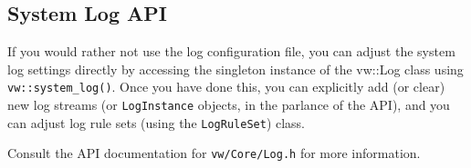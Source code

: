 \subsection{System Log API}
If you would rather not use the log configuration file, you can adjust
the system log settings directly by accessing the singleton instance of
the vw::Log class using \verb#vw::system_log()#.  Once you have done
this, you can explicitly add (or clear) new log streams (or
\verb#LogInstance# objects, in the parlance of the API), and you can
adjust log rule sets (using the \verb#LogRuleSet#) class.

Consult the API documentation for \verb#vw/Core/Log.h# for more
information.

